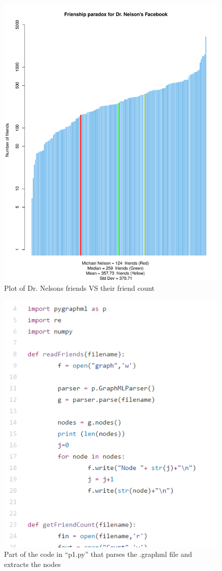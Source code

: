 \documentclass{article}
\begin{document}
\begin{figure}[H]
 \centering
 	\includegraphics[height=17 cm]{facebook.pdf}
  \caption{Plot of Dr. Nelsons friends VS their friend count}
\end{figure}

\begin{figure}[H]
 \centering
 	\includegraphics[height=12 cm]{p1code.png}
  \caption{Part of the code in ``p1.py'' that parses the .graphml file and extracts the nodes}
\end{figure}
\end{document}

